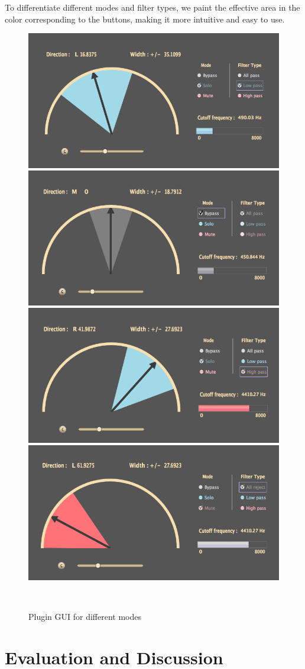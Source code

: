 \documentclass{sig-alternate}
\begin{document}
To differentiate different modes and filter types, we paint the effective area in the color corresponding to the buttons, making it more intuitive and easy to use.

\begin{figure}
  \begin{minipage}{0.5\textwidth}
    \centering
    \includegraphics[width=.48\textwidth]{UI1}\quad
    \includegraphics[width=.48\textwidth]{UI2}\\
    \includegraphics[width=.48\textwidth]{UI3}\quad
    \includegraphics[width=.48\textwidth]{UI4}
    \caption{Plugin GUI for different modes}
    \label{fig:UI}
  \end{minipage}\\[1em]
\end{figure}
	

\section{Evaluation and Discussion}\label{sec:evaluation}
\end{document}

